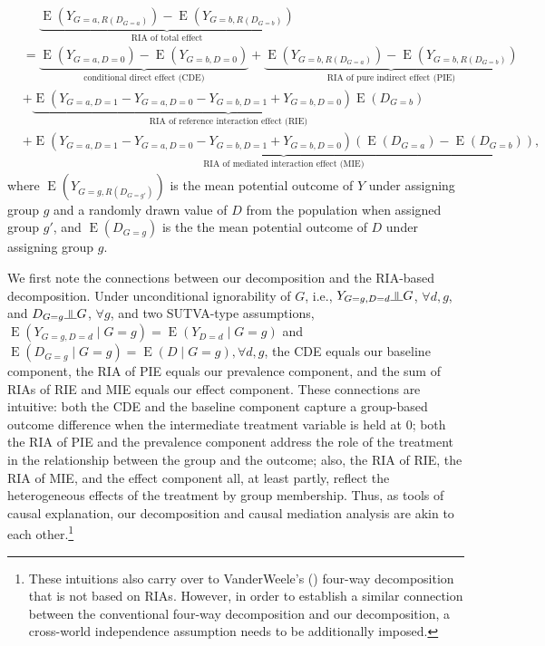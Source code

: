 \documentclass[12pt,a4paper]{article}
\newcommand{\indep}{\rotatebox[origin=c]{90}{$\models$}}  %
\newcommand{\E}{\operatorname{E}}
\begin{document}
\begin{align*}
    &\phantom{{}={}} \underbrace{\E \left(Y_{G=a, R(D_{G=a})} \right)-\E \left(Y_{G=b, R(D_{G=b})} \right)}_{\text{RIA of total effect}} \\
    &=
    \underbrace{\E(Y_{G=a, D=0})-\E(Y_{G=b, D=0})}_{\text{conditional direct effect (CDE)}} +
    \underbrace{\E \left(Y_{G=b, R(D_{G=a})} \right)-\E \left(Y_{G=b, R(D_{G=b})} \right)}_{\text{RIA of pure indirect effect (PIE)}} \\
    & + \underbrace{\E(Y_{G=a, D=1}-Y_{G=a, D=0} - Y_{G=b, D=1} + Y_{G=b, D=0}) \E(D_{G=b})}_{\text{RIA of reference interaction effect (RIE)}} \\
    & + \underbrace{\E(Y_{G=a, D=1}-Y_{G=a, D=0} - Y_{G=b, D=1} + Y_{G=b, D=0}) \left(\E(D_{G=a})-\E(D_{G=b})\right)}_{\text{RIA of mediated interaction effect (MIE)}}, 
\end{align*}
where $\E \left(Y_{G=g, R(D_{G=g'})} \right)$ is the mean potential outcome of $Y$ under assigning group $g$ and a randomly drawn value of $D$ from the population when assigned group $g'$, and $\E(D_{G=g})$ is the the mean potential outcome of $D$ under assigning group $g$.

We first note the connections between our decomposition and the RIA-based decomposition. 
Under unconditional ignorability of $G$, i.e., $Y_{G=g,D=d} \indep G$, $\forall d,g$, and $D_{G=g} \indep G$, $\forall g$, and two SUTVA-type assumptions, $\E(Y_{G=g,D=d} \mid  G=g)=\E(Y_{D=d} \mid  G=g)$ and $\E(D_{G=g} \mid  G=g)=\E(D \mid  G=g), \forall d,g$, the CDE equals our baseline component, the RIA of PIE equals our prevalence component, and the sum of RIAs of RIE and MIE equals our effect component. These connections are intuitive: both the CDE and the baseline component capture a group-based outcome difference when the intermediate treatment variable is held at $0$; both the RIA of PIE and the prevalence component address the role of the treatment in the relationship between the group and the outcome; also, the RIA of RIE, the RIA of MIE, and the effect component all, at least partly, reflect the heterogeneous effects of the treatment by group membership. Thus, as tools of causal explanation, our decomposition and causal mediation analysis are akin to each other.\footnote{These intuitions also carry over to VanderWeele's (\citeyear{vanderweele_unification_2014}) four-way decomposition that is not based on RIAs. However, in order to establish a similar connection between the conventional four-way decomposition and our decomposition, a cross-world independence assumption needs to be additionally imposed.}
\end{document}
